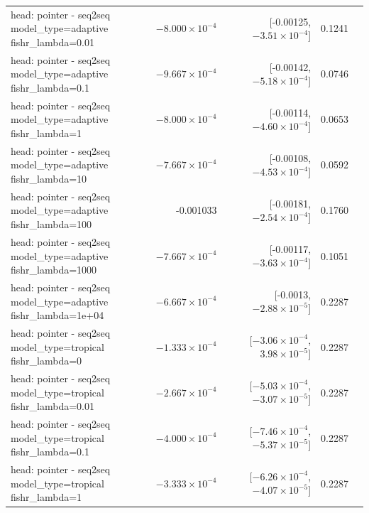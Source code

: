 \documentclass[10pt]{article}
\makeatletter
\newcommand{\stackcell}[1]{\begin{tabular}[t]{@{}l@{}}#1\end{tabular}}
\makeatother
\begin{document}
{\begin{longtable}{lrrrl}
\stackcell{head: pointer - seq2seq\\\footnotesize model\_type=adaptive fishr\_lambda=0.01 } & $-8.000\times10^{-4}$ & [-0.00125, $-3.51\times10^{-4}$] & 0.1241 & \\
\stackcell{head: pointer - seq2seq\\\footnotesize model\_type=adaptive fishr\_lambda=0.1 } & $-9.667\times10^{-4}$ & [-0.00142, $-5.18\times10^{-4}$] & 0.0746 & \\
\stackcell{head: pointer - seq2seq\\\footnotesize model\_type=adaptive fishr\_lambda=1 } & $-8.000\times10^{-4}$ & [-0.00114, $-4.60\times10^{-4}$] & 0.0653 & \\
\stackcell{head: pointer - seq2seq\\\footnotesize model\_type=adaptive fishr\_lambda=10 } & $-7.667\times10^{-4}$ & [-0.00108, $-4.53\times10^{-4}$] & 0.0592 & \\
\stackcell{head: pointer - seq2seq\\\footnotesize model\_type=adaptive fishr\_lambda=100 } & -0.001033 & [-0.00181, $-2.54\times10^{-4}$] & 0.1760 & \\
\stackcell{head: pointer - seq2seq\\\footnotesize model\_type=adaptive fishr\_lambda=1000 } & $-7.667\times10^{-4}$ & [-0.00117, $-3.63\times10^{-4}$] & 0.1051 & \\
\stackcell{head: pointer - seq2seq\\\footnotesize model\_type=adaptive fishr\_lambda=1e+04 } & $-6.667\times10^{-4}$ & [-0.0013, $-2.88\times10^{-5}$] & 0.2287 & \\
\stackcell{head: pointer - seq2seq\\\footnotesize model\_type=tropical fishr\_lambda=0 } & $-1.333\times10^{-4}$ & [$-3.06\times10^{-4}$, $3.98\times10^{-5}$] & 0.2287 & \\
\stackcell{head: pointer - seq2seq\\\footnotesize model\_type=tropical fishr\_lambda=0.01 } & $-2.667\times10^{-4}$ & [$-5.03\times10^{-4}$, $-3.07\times10^{-5}$] & 0.2287 & \\
\stackcell{head: pointer - seq2seq\\\footnotesize model\_type=tropical fishr\_lambda=0.1 } & $-4.000\times10^{-4}$ & [$-7.46\times10^{-4}$, $-5.37\times10^{-5}$] & 0.2287 & \\
\stackcell{head: pointer - seq2seq\\\footnotesize model\_type=tropical fishr\_lambda=1 } & $-3.333\times10^{-4}$ & [$-6.26\times10^{-4}$, $-4.07\times10^{-5}$] & 0.2287 & \\

\end{longtable}}
\end{document}
